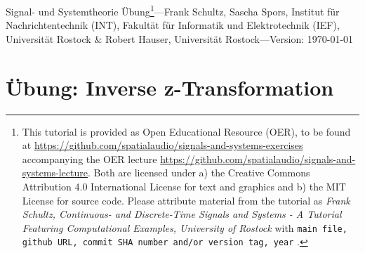 \documentclass[11pt,a4paper,DIV=12]{scrartcl}
\begin{document}
\noindent Signal- und Systemtheorie Übung\footnote{This tutorial is provided as
Open Educational Resource (OER), to be found at
\url{https://github.com/spatialaudio/signals-and-systems-exercises}
accompanying the OER lecture
\url{https://github.com/spatialaudio/signals-and-systems-lecture}.
%
Both are licensed under a) the Creative Commons Attribution 4.0 International
License for text and graphics and b) the MIT License for source code.
%
Please attribute material from the tutorial as \textit{Frank Schultz,
Continuous- and Discrete-Time Signals and Systems - A Tutorial Featuring
Computational Examples, University of Rostock} with
\texttt{main file, github URL, commit SHA number and/or version tag, year}
.}---Frank Schultz, Sascha Spors,
Institut für Nachrichtentechnik (INT),
Fakultät für Informatik und Elektrotechnik (IEF),
Universität Rostock \&
Robert Hauser, Universität Rostock---Version: \today

\section{Übung: Inverse z-Transformation}

\end{document}

